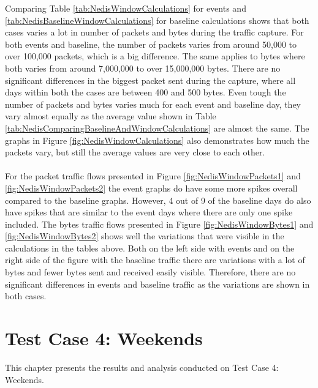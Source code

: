 Comparing Table \ref{tab:NedisWindowCalculations} for events and \ref{tab:NedisBaselineWindowCalculations} for baseline calculations shows that both cases varies a lot in number of packets and bytes during the traffic capture. For both events and baseline, the number of packets varies from around 50,000 to over 100,000 packets, which is a big difference. The same applies to bytes where both varies from around 7,000,000 to over 15,000,000 bytes. There are no significant differences in the biggest packet sent during the capture, where all days within both the cases are between 400 and 500 bytes. Even tough the number of packets and bytes varies much for each event and baseline day, they vary almost equally as the average value shown in Table \ref{tab:NedisComparingBaselineAndWindowCalculations} are almost the same. The graphs in Figure \ref{fig:NedisWindowCalculations} also demonstrates how much the packets vary, but still the average values are very close to each other. 
\\\\
For the packet traffic flows presented in Figure \ref{fig:NedisWindowPackets1} and \ref{fig:NedisWindowPackets2} the event graphs do have some more spikes overall compared to the baseline graphs. However, 4 out of 9 of the baseline days do also have spikes that are similar to the event days where there are only one spike included. The bytes traffic flows presented in Figure \ref{fig:NedisWindowBytes1} and \ref{fig:NedisWindowBytes2} shows well the variations that were visible in the calculations in the tables above. Both on the left side with events and on the right side of the figure with the baseline traffic there are variations with a lot of bytes and fewer bytes sent and received easily visible. Therefore, there are no significant differences in events and baseline traffic as the variations are shown in both cases. 


\newpage
\section{Test Case 4: Weekends}
This chapter presents the results and analysis conducted on Test Case 4: Weekends. 
